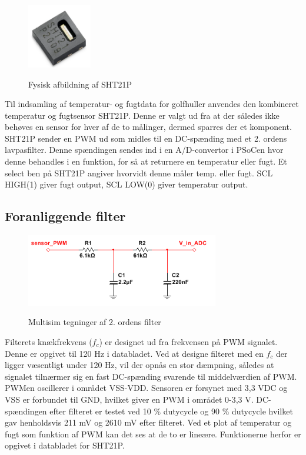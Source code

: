 
\begin{figure}[htb]
\centering
{\includegraphics[width=0.25\textwidth]{filer/design/Billeder/sht21p_fysisk.png}}
\caption{Fysisk afbildning af SHT21P}
\label{lab:sht_filter}
\end{figure}

Til indsamling af temperatur- og fugtdata for golfhuller anvendes den kombineret temperatur og fugtsensor SHT21P. Denne er valgt ud fra at der således ikke behøves en sensor for hver af de to målinger, dermed sparres der et komponent. SHT21P sender en PWM ud som midles til en DC-spænding med et 2. ordens lavpasfilter. Denne spændingen sendes ind i en A/D-convertor i PSoCen hvor denne behandles i en funktion, for så at returnere en temperatur eller fugt. Et select ben på SHT21P angiver hvorvidt denne måler temp. eller fugt. SCL HIGH(1) giver fugt output, SCL LOW(0) giver temperatur output.

\subsection{Foranliggende filter}
\begin{figure}[htb]
\centering
{\includegraphics[width=0.75\textwidth]{filer/design/Billeder/sht21p_filter_pic.png}}
\caption{Multisim tegninger af 2. ordens filter}
\label{lab:sht_filter_pic}
\end{figure}

Filterets knækfrekvens ($f_c$) er designet ud fra frekvensen på PWM signalet. Denne er opgivet til 120 Hz i databladet. Ved at designe filteret med en $f_c$ der ligger væsentligt under 120 Hz, vil der opnås en stor dæmpning, således at signalet tilnærmer sig en fast DC-spænding svarende til middelværdien af PWM. PWMen oscillerer i området VSS-VDD. Sensoren er forsynet med 3,3 VDC og VSS er forbundet til GND, hvilket giver en PWM i området 0-3,3 V. DC-spændingen efter filteret er testet ved 10 \% dutycycle og 90 \% dutycycle hvilket gav henholdsvis 211 mV og 2610 mV efter filteret. Ved et plot af temperatur og fugt som funktion af PWM kan det ses at de to er lineære. Funktionerne herfor er opgivet i databladet for SHT21P. 


